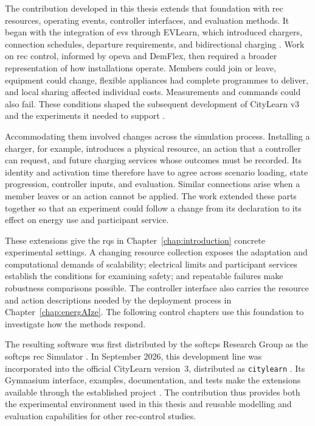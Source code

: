 The contribution developed in this thesis extends that foundation with \gls{rec} resources, operating events, controller interfaces, and evaluation methods. It began with the integration of \glspl{ev} through EVLearn, which introduced chargers, connection schedules, departure requirements, and bidirectional charging \parencite{fonseca2025evlearn}. Work on \gls{rec} control, informed by \gls{opeva} and DemFlex, then required a broader representation of how installations operate. Members could join or leave, equipment could change, flexible appliances had complete programmes to deliver, and local sharing affected individual costs. Measurements and commands could also fail. These conditions shaped the subsequent development of CityLearn v3 and the experiments it needed to support \parencite{fonseca2026citylearnv3}.

Accommodating them involved changes across the simulation process. Installing a charger, for example, introduces a physical resource, an action that a controller can request, and future charging services whose outcomes must be recorded. Its identity and activation time therefore have to agree across scenario loading, state progression, controller inputs, and evaluation. Similar connections arise when a member leaves or an action cannot be applied. The work extended these parts together so that an experiment could follow a change from its declaration to its effect on energy use and participant service.

These extensions give the \glspl{rq} in Chapter~\ref{chap:introduction} concrete experimental settings. A changing resource collection exposes the adaptation and computational demands of scalability; electrical limits and participant services establish the conditions for examining safety; and repeatable failures make robustness comparisons possible. The controller interface also carries the resource and action descriptions needed by the deployment process in Chapter~\ref{chap:energAIze}. The following control chapters use this foundation to investigate how the methods respond.

\label{sec:sim-public-release}
The resulting software was first distributed by the \gls{softcps} Research Group as the \gls{softcps} \gls{rec} Simulator \parencite{softcps2026simulatorrepo,softcps2026pypi}. In September 2026, this development line was incorporated into the official CityLearn version~3, distributed as \texttt{citylearn} \parencite{citylearn2026v3release}. Its Gymnasium interface, examples, documentation, and tests make the extensions available through the established project \parencite{citylearn2026official}. The contribution thus provides both the experimental environment used in this thesis and reusable modelling and evaluation capabilities for other \gls{rec}-control studies.

